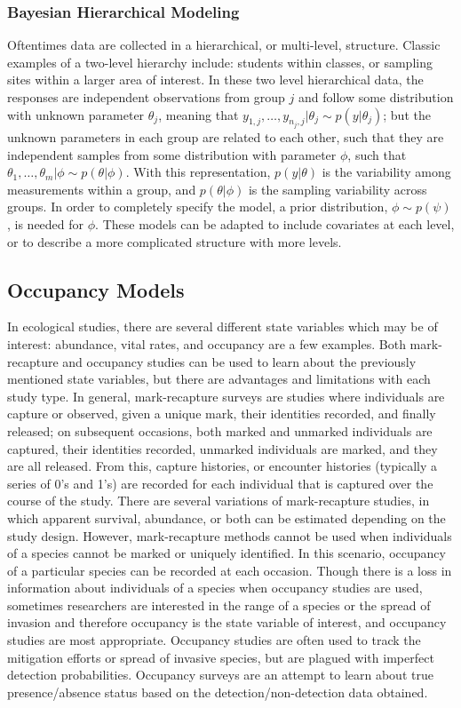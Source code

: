 \documentclass[12pt]{article}\usepackage[]{graphicx}\usepackage[]{color}
\begin{document}
\subsubsection{Bayesian Hierarchical Modeling}

Oftentimes data are collected in a hierarchical, or multi-level, structure. Classic examples of a two-level hierarchy include: students within classes, or sampling sites within a larger area of interest. In these two level hierarchical data, the responses are independent observations from group $j$ and follow some distribution with unknown parameter $\theta_j$, meaning that $y_{1, j}, \dots, y_{n_j, j}|\theta_j \sim p(y|\theta_j)$; but the unknown parameters in each group are related to each other, such that they are independent samples from some distribution with parameter $\phi$, such that $\theta_1, \dots, \theta_m|\phi \sim p(\theta|\phi)$. With this representation, $p(y|\theta)$ is the variability among measurements within a group, and $p(\theta|\phi)$ is the sampling variability across groups. In order to completely specify the model, a prior distribution, $\phi \sim p(\psi)$, is needed for $\phi$. These models can be adapted to include covariates at each level, or to describe a more complicated structure with more levels. 

\subsection{Occupancy Models}

In ecological studies, there are several different state variables which may be of interest: abundance, vital rates, and occupancy are a few examples. Both mark-recapture and occupancy studies can be used to learn about the previously mentioned state variables, but there are advantages and limitations with each study type. In general, mark-recapture surveys are studies where individuals are capture or observed, given a unique mark, their identities recorded, and finally released; on subsequent occasions, both marked and unmarked individuals are captured, their identities recorded, unmarked individuals are marked, and they are all released. From this, capture histories, or encounter histories (typically a series of 0's and 1's) are recorded for each individual that is captured over the course of the study. There are several variations of mark-recapture studies, in which apparent survival, abundance, or both can be estimated depending on the study design. However, mark-recapture methods cannot be used when individuals of a species cannot be marked or uniquely identified. In this scenario, occupancy of a particular species can be recorded at each occasion. Though there is a loss in information about individuals of a species when occupancy studies are used, sometimes researchers are interested in the range of a species or the spread of invasion and therefore occupancy is the state variable of interest, and occupancy studies are most appropriate. Occupancy studies are often used to track the mitigation efforts or spread of invasive species, but are plagued with imperfect detection probabilities. Occupancy surveys are an attempt to learn about true presence/absence status based on the  detection/non-detection data obtained.  
\end{document}
